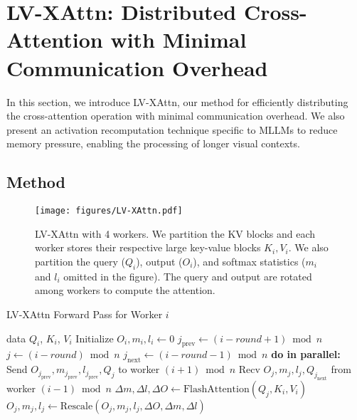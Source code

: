 \section{LV-XAttn: Distributed Cross-Attention with Minimal Communication Overhead}
In this section, we introduce LV-XAttn, our method for efficiently distributing the cross-attention operation with minimal communication overhead. We also present an activation recomputation technique specific to MLLMs to reduce memory pressure, enabling the processing of longer visual contexts.
\subsection{Method}
\begin{figure*}[t]
    \centering
    \texttt{[image: figures/LV-XAttn.pdf]}
    \caption{LV-XAttn with 4 workers. We partition the KV blocks and each worker  stores their respective large key-value blocks $K_i, V_i$. We also partition the query ($Q_i$), output ($O_i$), and softmax statistics ($m_i$ and $l_i$ omitted in the figure). The query and output are rotated among workers to compute the attention.}
    \label{fig:lv-xattn}
\end{figure*}
\begin{algorithm}[tb]
   \caption{LV-XAttn Forward Pass for Worker $i$}
   \label{alg:lv-xattn}
    \begin{algorithmic}
        data $Q_i$, $K_i$, $V_i$
       \STATE Initialize $O_i, m_i, l_i \gets 0$
            \STATE $j_{\text{prev}} \gets (i-round+1) \bmod n$
            \STATE $j \gets (i-round) \bmod n$
            \STATE $j_{\text{next}} \gets (i-round-1) \bmod n$
            \STATE \textbf{do in parallel:}
            \STATE \hspace{1em} Send $O_{j_{\text{prev}}}, m_{j_{\text{prev}}}, l_{j_{\text{prev}}}, Q_{j}$ to worker $(i+1) \bmod n$
            \STATE \hspace{1em} Recv $O_{j}, m_{j}, l_{j}, Q_{j_{\text{next}}}$ from worker $(i-1) \bmod n$
            \STATE \hspace{1em} $\Delta m, \Delta l, \Delta O \gets \text{FlashAttention}(Q_{j}, K_i, V_i)$
            \STATE $O_{j}, m_{j}, l_{j} \gets \text{Rescale}(O_{j}, m_{j}, l_{j}, \Delta O, \Delta m, \Delta l)$
       \ENDFOR
    \end{algorithmic}
\end{algorithm}
